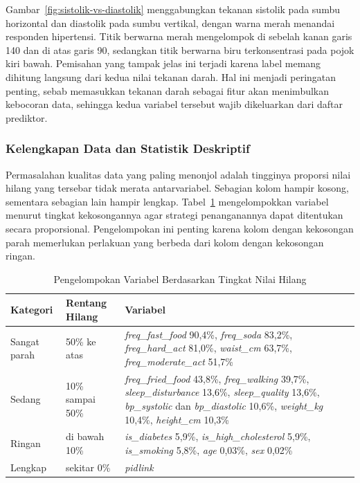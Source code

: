 Gambar~\ref{fig:sistolik-vs-diastolik} menggabungkan tekanan sistolik pada sumbu horizontal dan diastolik pada sumbu vertikal, dengan warna merah menandai responden hipertensi. Titik berwarna merah mengelompok di sebelah kanan garis 140 dan di atas garis 90, sedangkan titik berwarna biru terkonsentrasi pada pojok kiri bawah. Pemisahan yang tampak jelas ini terjadi karena label memang dihitung langsung dari kedua nilai tekanan darah. Hal ini menjadi peringatan penting, sebab memasukkan tekanan darah sebagai fitur akan menimbulkan kebocoran data, sehingga kedua variabel tersebut wajib dikeluarkan dari daftar prediktor.
 
\subsubsection{Kelengkapan Data dan Statistik Deskriptif}
 
Permasalahan kualitas data yang paling menonjol adalah tingginya proporsi nilai hilang yang tersebar tidak merata antarvariabel. Sebagian kolom hampir kosong, sementara sebagian lain hampir lengkap. Tabel~\ref{tab:missing-value-grouping} mengelompokkan variabel menurut tingkat kekosongannya agar strategi penanganannya dapat ditentukan secara proporsional. Pengelompokan ini penting karena kolom dengan kekosongan parah memerlukan perlakuan yang berbeda dari kolom dengan kekosongan ringan.
 
\begin{table}[H]
    \centering
    \caption{Pengelompokan Variabel Berdasarkan Tingkat Nilai Hilang}
    \label{tab:missing-value-grouping}
    \begin{tabular}{@{}p{2.3cm} p{2.6cm} p{8.3cm}@{}}
        \toprule
        \textbf{Kategori} & \textbf{Rentang Hilang} & \textbf{Variabel} \\
        \midrule

        Sangat parah & 50\% ke atas &
        \textit{freq\_fast\_food} 90,4\%, \textit{freq\_soda} 83,2\%, \textit{freq\_hard\_act} 81,0\%, \textit{waist\_cm} 63,7\%, \textit{freq\_moderate\_act} 51,7\% \\[4pt]

        Sedang & 10\% sampai 50\% &
        \textit{freq\_fried\_food} 43,8\%, \textit{freq\_walking} 39,7\%, \textit{sleep\_disturbance} 13,6\%, \textit{sleep\_quality} 13,6\%, \textit{bp\_systolic} dan \textit{bp\_diastolic} 10,6\%, \textit{weight\_kg} 10,4\%, \textit{height\_cm} 10,3\% \\[4pt]

        Ringan & di bawah 10\% &
        \textit{is\_diabetes} 5,9\%, \textit{is\_high\_cholesterol} 5,9\%, \textit{is\_smoking} 5,8\%, \textit{age} 0,03\%, \textit{sex} 0,02\% \\[4pt]

        Lengkap & sekitar 0\% &
        \textit{pidlink} \\

        \bottomrule
    \end{tabular}

    \vspace{2mm}

\end{table}
 
